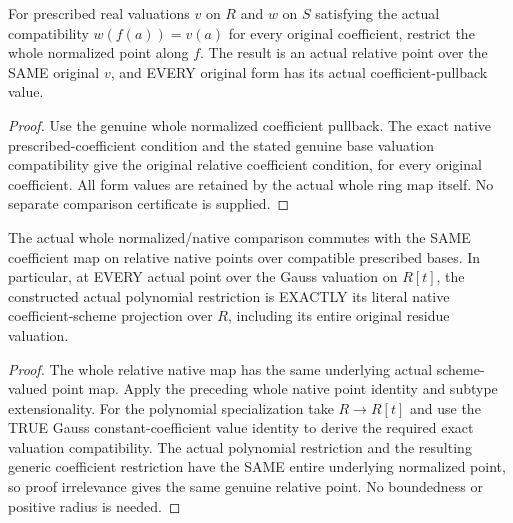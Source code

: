 \begin{definition}
\label{projective:actual-relative-coefficient-pullback}
\leanok
{}
For prescribed real valuations $v$ on $R$ and $w$ on $S$ satisfying the
actual compatibility $w(f(a))=v(a)$ for every original coefficient,
restrict the whole normalized point along $f$. The result is an actual
relative point over the SAME original $v$, and EVERY original form has
its actual coefficient-pullback value.
\end{definition}
\begin{proof}
Use the genuine whole normalized coefficient pullback. The exact native
prescribed-coefficient condition and the stated genuine base valuation
compatibility give the original relative coefficient condition, for
every original coefficient. All form values are retained by the actual
whole ring map itself. No separate comparison certificate is supplied.
\end{proof}

\begin{theorem}
\label{projective:actual-relative-native-coefficient-naturality}
\leanok
{}
The actual whole normalized/native comparison commutes with the SAME
coefficient map on relative native points over compatible prescribed
bases. In particular, at EVERY actual point over the Gauss valuation on
$R[t]$, the constructed actual polynomial restriction is
EXACTLY its literal native coefficient-scheme projection over $R$,
including its entire original residue valuation.
\end{theorem}
\begin{proof}
The whole relative native map has the same underlying actual scheme-valued
point map. Apply the preceding whole native point identity and subtype
extensionality. For the polynomial specialization take $R\to R[t]$ and
use the TRUE Gauss constant-coefficient value identity to derive the
required exact valuation compatibility. The actual polynomial restriction
and the resulting generic coefficient restriction have the SAME entire
underlying normalized point, so proof irrelevance gives the same genuine
relative point. No boundedness or positive radius is needed.
\end{proof}
